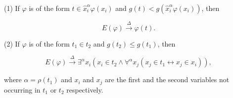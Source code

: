 (1) If $\varphi$ is of the form $t \in \hat{x}_i^\alpha \varphi(x_i)$ and $g(t) < g(\hat{x}_i^\alpha \varphi(x_i))$, then

$$E(\varphi) \overset{\Delta}{\rightarrow} \varphi(t).$$

(2) If $\varphi$ is of the form $t_1 \in t_2$ and $g(t_2) \leq g(t_1)$, then

$$E(\varphi) \overset{\Delta}{\rightarrow} \exists^\alpha x_i(x_i \in t_2 \land \forall^\alpha x_j(x_j \in t_1 \leftrightarrow x_j \in x_i)),$$

where $\alpha = \rho(t_1)$ and $x_i$ and $x_j$ are the first and the second variables not occurring in $t_1$ or $t_2$ respectively.
